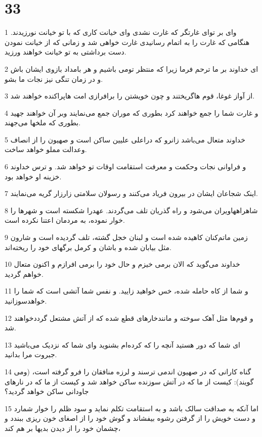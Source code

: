 \chapter{33}

\par 1 وای بر تو‌ای غارتگر که غارت نشدی وای خیانت کاری که با تو خیانت نورزیدند. هنگامی که غارت را به اتمام رسانیدی غارت خواهی شد و زمانی که از خیانت نمودن دست برداشتی به تو خیانت خواهند ورزید.
\par 2 ‌ای خداوند بر ما ترحم فرما زیرا که منتظر تومی باشیم و هر بامداد بازوی ایشان باش و در زمان تنگی نیز نجات ما بشو. 
\par 3 از آواز غوغا، قوم هاگریختند و چون خویشتن را برافرازی امت هاپراکنده خواهند شد.
\par 4 و غارت شما را جمع خواهند کرد بطوری که موران جمع می‌نمایند وبر آن خواهند جهید بطوری که ملخها می‌جهند.
\par 5 خداوند متعال می‌باشد زانرو که دراعلی علیین ساکن است و صهیون را از انصاف وعدالت مملو خواهد ساخت.
\par 6 و فراوانی نجات وحکمت و معرفت استقامت اوقات تو خواهد شد. و ترس خداوند خزینه او خواهد بود.
\par 7 اینک شجاعان ایشان در بیرون فریاد می‌کنند و رسولان سلامتی زار‌زار گریه می‌نمایند.
\par 8 شاهراههاویران می‌شود و راه گذریان تلف می‌گردند. عهدرا شکسته است و شهرها را خوار نموده، به مردمان اعتنا نکرده است.
\par 9 زمین ماتم‌کنان کاهیده شده است و لبنان خجل گشته، تلف گردیده است و شارون مثل بیابان شده و باشان و کرمل برگهای خود را ریخته‌اند.
\par 10 خداوند می‌گوید که الان برمی خیزم و حال خود را برمی افرازم و اکنون متعال خواهم گردید.
\par 11 و شما از کاه حامله شده، خس خواهید زایید. و نفس شما آتشی است که شما را خواهدسوزانید.
\par 12 و قوم‌ها مثل آهک سوخته و مانندخارهای قطع شده که از آتش مشتعل گرددخواهند شد.
\par 13 ‌ای شما که دور هستید آنچه را که کرده‌ام بشنوید و‌ای شما که نزدیک می‌باشید جبروت مرا بدانید.
\par 14 گناه کارانی که در صهیون اندمی ترسند و لرزه منافقان را فرو گرفته است، (ومی گویند): کیست از ما که در آتش سوزنده ساکن خواهد شد و کیست از ما که در نارهای جاودانی ساکن خواهد گردید؟
\par 15 اما آنکه به صداقت سالک باشد و به استقامت تکلم نماید و سود ظلم را خوار شمارد و دست خویش را از گرفتن رشوه بیفشاند و گوش خود را از اصغای خون ریزی ببندد و چشمان خود را از دیدن بدیها بر هم کند،
